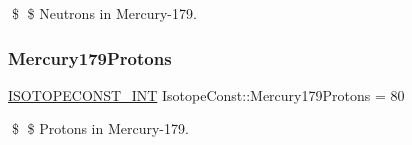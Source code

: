 \$ \$ Neutrons in Mercury-\/179. \mbox{\label{group___isotope_const-_mercury-_hg179_ga8b77c8f6f02e57c6f352f463525329f9}} 
\subsubsection{\texorpdfstring{Mercury179\+Protons}{Mercury179Protons}}
{\footnotesize\ttfamily \mbox{\hyperlink{group___isotope_const-_macros_ga5f18360b3e99483a35c32d789e62621c}{I\+S\+O\+T\+O\+P\+E\+C\+O\+N\+S\+T\+\_\+\+I\+NT}} Isotope\+Const\+::\+Mercury179\+Protons = 80}

\$ \$ Protons in Mercury-\/179. 